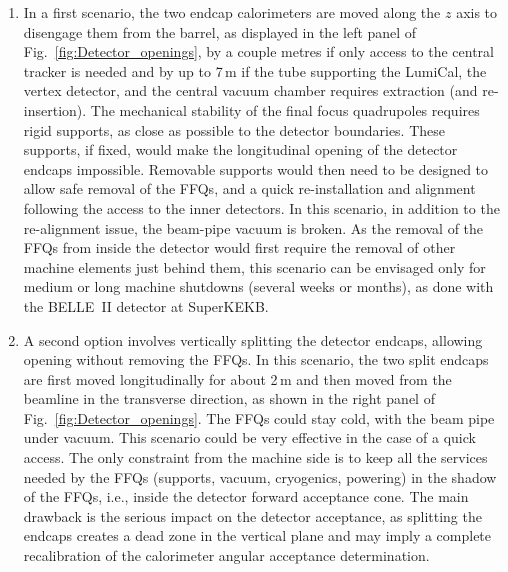 \begin{enumerate}

\item In a first scenario, the two endcap calorimeters are moved along the $z$ axis to disengage them from the barrel, 
as displayed in the left panel of Fig.~\ref{fig:Detector_openings}, 
by a couple metres if only access to the central tracker is needed 
and by up to 7\,m if the tube supporting the LumiCal, the vertex detector, and the central vacuum chamber requires extraction (and re-insertion). 
The mechanical stability of the final focus quadrupoles requires rigid supports, as close as possible to the detector boundaries. 
These supports, if fixed, would make the longitudinal opening of the detector endcaps  impossible. 
Removable supports would then need to be designed to allow safe removal of the FFQs, 
and a quick re-installation and alignment following the access to the inner detectors. 
In this scenario, in addition to the re-alignment issue, the beam-pipe vacuum is broken. 
As the removal of the FFQs from inside the detector would first require the removal of other machine elements just behind them, 
this scenario can be envisaged only for medium or long machine shutdowns (several weeks or months), 
as done with the BELLE~II detector at SuperKEKB.

\item A second option involves vertically splitting the detector endcaps, allowing opening without removing the FFQs. 
In this scenario, the two split endcaps are first moved longitudinally for about 2\,m and
then moved from the beamline in the transverse direction, as shown in the right panel of Fig.~\ref{fig:Detector_openings}. 
The FFQs could stay cold, with the beam pipe under vacuum. 
This scenario could be very effective in the case of a quick access. 
The only constraint from the machine side is to keep all the services needed by the FFQs 
(supports, vacuum, cryogenics, powering) 
in the shadow of the FFQs, i.e., inside the detector forward acceptance cone. 
The main drawback is the serious impact on the detector acceptance, 
as splitting the endcaps creates a dead zone in the vertical plane 
and may imply a complete recalibration of the calorimeter angular acceptance determination.
    

\end{enumerate}
